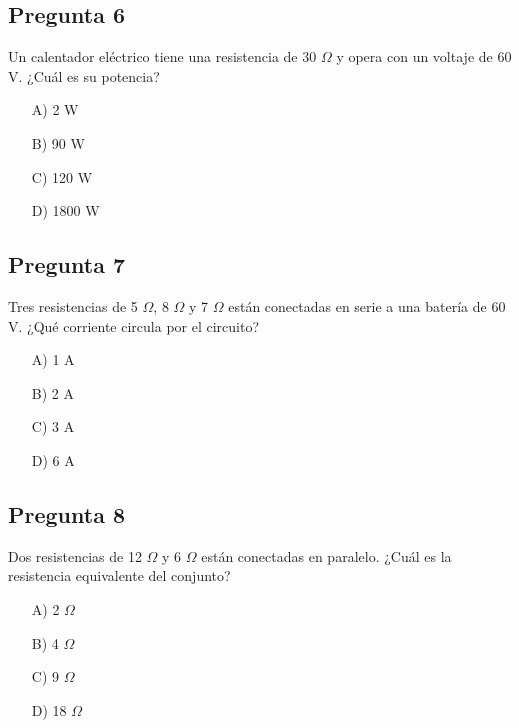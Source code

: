 \begin{preguntabox}
\subsection*{Pregunta 6}
Un calentador eléctrico tiene una resistencia de 30 $\Omega$ y opera con un voltaje de 60 V. ¿Cuál es su potencia?

\begin{enumerate}
    \item[A)] 2 W
    \item[B)] 90 W
    \item[C)] 120 W
    \item[D)] 1800 W
\end{enumerate}
\end{preguntabox}

\begin{preguntabox}
\subsection*{Pregunta 7}
Tres resistencias de 5 $\Omega$, 8 $\Omega$ y 7 $\Omega$ están conectadas en serie a una batería de 60 V. ¿Qué corriente circula por el circuito?

\begin{enumerate}
    \item[A)] 1 A
    \item[B)] 2 A
    \item[C)] 3 A
    \item[D)] 6 A
\end{enumerate}
\end{preguntabox}

\begin{preguntabox}
\subsection*{Pregunta 8}
Dos resistencias de 12 $\Omega$ y 6 $\Omega$ están conectadas en paralelo. ¿Cuál es la resistencia equivalente del conjunto?

\begin{enumerate}
    \item[A)] 2 $\Omega$
    \item[B)] 4 $\Omega$
    \item[C)] 9 $\Omega$
    \item[D)] 18 $\Omega$
\end{enumerate}
\end{preguntabox}

